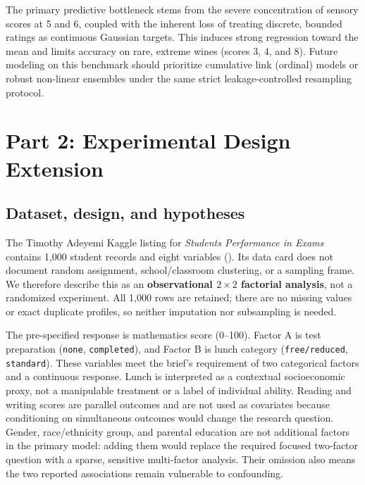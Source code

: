 \documentclass[
  10pt,
]{article}
\begin{document}
The primary predictive bottleneck stems from the severe concentration of
sensory scores at 5 and 6, coupled with the inherent loss of
treating discrete, bounded ratings as continuous Gaussian targets. This
induces strong regression toward the mean and limits accuracy on rare,
extreme wines (scores 3, 4, and 8). Future modeling on this benchmark
should prioritize cumulative link (ordinal) models or robust non-linear
ensembles under the same strict leakage-controlled resampling protocol.

\clearpage

\section{Part 2: Experimental Design
Extension}\label{part-2-experimental-design-extension}

\subsection{Dataset, design, and
hypotheses}\label{dataset-design-and-hypotheses}

The Timothy Adeyemi Kaggle listing for \emph{Students Performance in
Exams} contains 1,000 student records and eight variables
(). Its data card
does not document random assignment, school/classroom clustering, or a
sampling frame. We therefore describe this as an \textbf{observational
\(2 \times 2\) factorial analysis}, not a randomized experiment. All 1,000
rows are retained; there are no missing values or exact duplicate
profiles, so neither imputation nor subsampling is needed.

The pre-specified response is mathematics score (0--100). Factor A is
test preparation (\texttt{none}, \texttt{completed}), and Factor B is
lunch category (\texttt{free/reduced}, \texttt{standard}). These
variables meet the brief's requirement of two categorical factors and a
continuous response. Lunch is interpreted as a contextual socioeconomic
proxy, not a manipulable treatment or a label of individual ability.
Reading and writing scores are parallel outcomes and are not used as
covariates because conditioning on simultaneous outcomes would change
the research question. Gender, race/ethnicity group, and parental
education are not additional factors in the primary model: adding them
would replace the required focused two-factor question with a sparse,
sensitive multi-factor analysis. Their omission also means the two
reported associations remain vulnerable to confounding.
\end{document}
